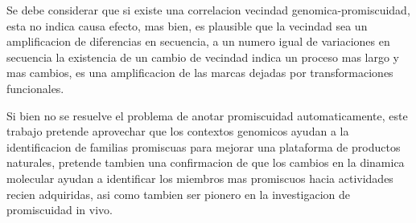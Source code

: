 \documentclass[12pt,twoside]{reedthesis}
\begin{document}
  Se debe considerar que si existe una correlacion vecindad
  genomica-promiscuidad, esta no indica causa efecto, mas bien, es
  plausible que la vecindad sea un amplificacion de diferencias en
  secuencia, a un numero igual de variaciones en secuencia la existencia
  de un cambio de vecindad indica un proceso mas largo y mas cambios, es
  una amplificacion de las marcas dejadas por transformaciones
  funcionales.
  
  Si bien no se resuelve el problema de anotar promiscuidad
  automaticamente, este trabajo pretende aprovechar que los contextos
  genomicos ayudan a la identificacion de familias promiscuas para mejorar
  una plataforma de productos naturales, pretende tambien una confirmacion
  de que los cambios en la dinamica molecular ayudan a identificar los
  miembros mas promiscuos hacia actividades recien adquiridas, asi como
  tambien ser pionero en la investigacion de promiscuidad in vivo.
  
\end{document}
